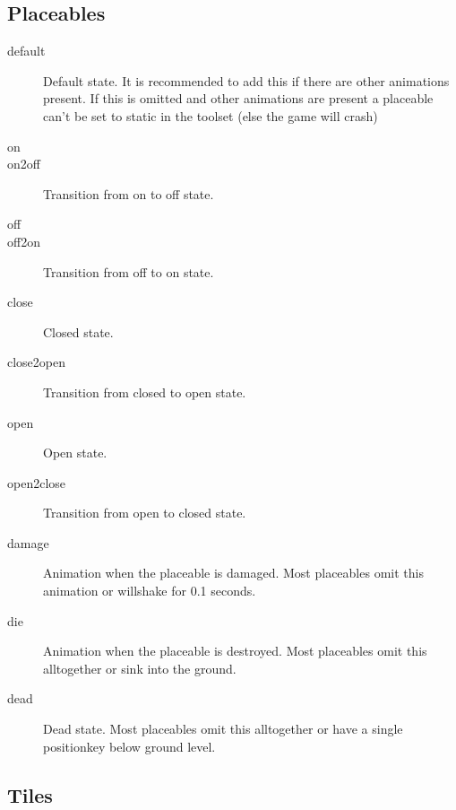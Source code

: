 \subsection{Placeables}
\begin{description}
    \item[default] Default state. It is recommended to add this if there are other animations present. If this is omitted and other animations are present a placeable can't be set to static in the toolset (else the game will crash)
    \item[on]
    \item[on2off] Transition from on to off state.
    \item[off]
    \item[off2on] Transition from off to on state.
    \item[close] Closed state.
    \item[close2open] Transition from closed to open state.
    \item[open] Open state.
    \item[open2close] Transition from open to closed state.
    \item[damage] Animation when the placeable is damaged. Most placeables omit this animation or willshake for 0.1 seconds.
    \item[die] Animation when the placeable is destroyed. Most placeables omit this alltogether or sink into the ground.
    \item[dead] Dead state. Most placeables omit this alltogether or have a single positionkey below ground level.
\end{description}

\subsection{Tiles}
